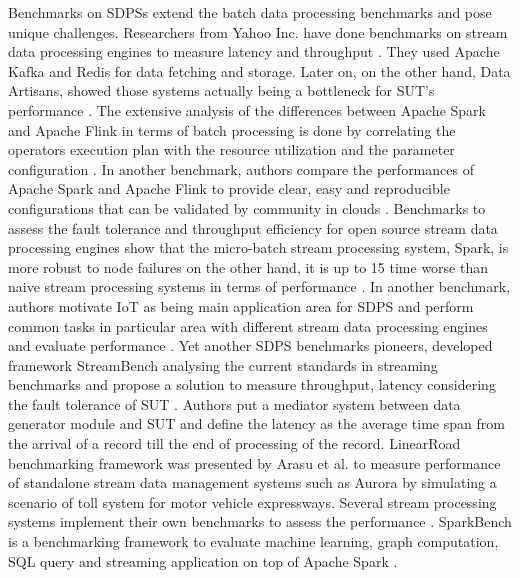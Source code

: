  Benchmarks on SDPSs extend the batch data processing benchmarks and  pose unique challenges. Researchers from Yahoo Inc. have done benchmarks on stream data processing engines to measure latency and throughput \cite{chintapalli2016benchmarking}. They used Apache Kafka \cite{kafka2014high} and Redis \cite{carlson2013redis} for data fetching and storage. Later on, on the other hand, Data Artisans, showed those systems actually being a bottleneck for SUT's performance \cite{dataartisans}.  The extensive analysis of the differences between Apache Spark and Apache Flink in terms of batch processing is done by correlating the operators execution plan with the resource utilization and the parameter configuration \cite{marcu2016spark}. In another benchmark, authors compare the performances of Apache Spark and Apache Flink to  provide clear, easy and reproducible configurations that can be validated by community in clouds \cite{perera2016reproducible}. Benchmarks to assess the fault tolerance and throughput efficiency for open source stream data processing engines  show that the micro-batch stream processing system, Spark, is more robust to node failures on the other hand, it is up to 15 time worse than naive stream processing systems in terms of performance \cite{lopez2016performance}. In another benchmark, authors motivate IoT as being main application area for SDPS and perform common tasks in particular area with different stream data processing engines and evaluate performance \cite{shukla2016benchmarking}. Yet another SDPS benchmarks pioneers, developed framework StreamBench analysing the current standards in streaming benchmarks and propose a solution to measure throughput, latency considering the fault tolerance of SUT \cite{lu2014stream}. Authors put a mediator system between data generator module and SUT and define the latency as the average time span from the arrival of a record till the end of processing of the record. LinearRoad benchmarking framework was presented by Arasu et al. to measure performance of standalone stream data management systems such as Aurora \cite{abadi2003aurora} by simulating a scenario of toll system for motor vehicle expressways. Several stream processing systems implement their own benchmarks to assess the performance \cite{neumeyer2010s4,qian2013timestream,zaharia2012discretized}. SparkBench is a benchmarking framework to evaluate machine learning, graph computation, SQL query and streaming application on top of Apache Spark \cite{li2015sparkbench}.
 
 
